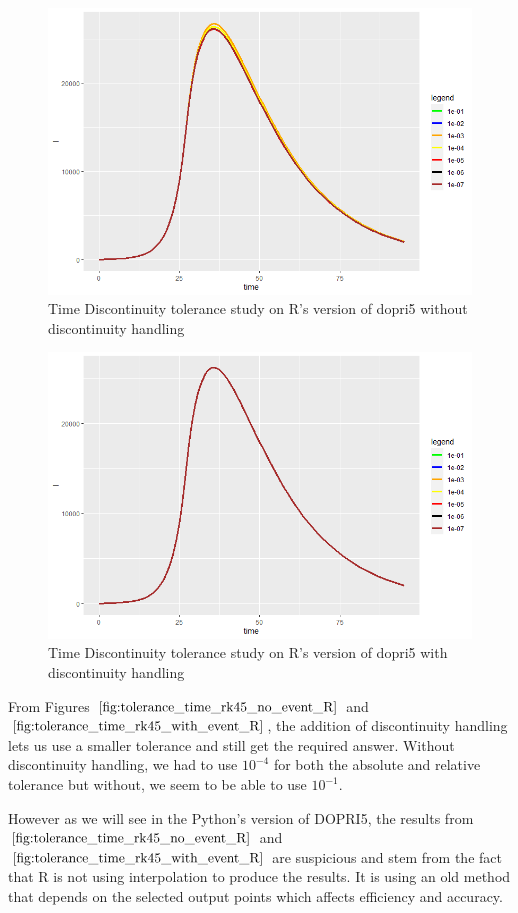 \begin{figure}[h]
	\centering
	\includegraphics[width=0.7\linewidth]{./figures/tolerance_time_rk45_no_event_R}
	\caption{Time Discontinuity tolerance study on R's version of dopri5 without discontinuity handling}
	\label{fig:tolerance_time_rk45_no_event_R}
\end{figure}

\begin{figure}[h]
	\centering
	\includegraphics[width=0.7\linewidth]{./figures/tolerance_time_rk45_with_event_R}
	\caption{Time Discontinuity tolerance study on R's version of dopri5 with discontinuity handling}
	\label{fig:tolerance_time_rk45_with_event_R}
\end{figure}

From Figures $\ref{fig:tolerance_time_rk45_no_event_R}$ and $\ref{fig:tolerance_time_rk45_with_event_R}$, the addition of discontinuity handling lets us use a smaller tolerance and still get the required answer. Without discontinuity handling, we had to use $10^{-4}$ for both the absolute and relative tolerance but without, we seem to be able to use $10^{-1}$. 

However as we will see in the Python's version of DOPRI5, the results from $\ref{fig:tolerance_time_rk45_no_event_R}$ and $\ref{fig:tolerance_time_rk45_with_event_R}$ are suspicious and stem from the fact that R is not using interpolation to produce the results. It is using an old method that depends on the selected output points which affects efficiency and accuracy.


